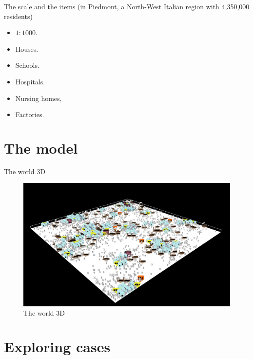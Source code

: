 \documentclass[8pt]{beamer}
\begin{document}
\begin{frame}{The scale and the items (in Piedmont, a North-West Italian region with 4,350,000 residents)}

\begin{itemize}

\item $1:1000$.

\bigskip

\item Houses.
\item Schools.
\item Hospitals.
\item Nursing homes,
\item Factories.

\end{itemize}

\end{frame}
\section{The model}


\begin{frame}{The world 3D}

\begin{figure}[H]
\center
\includegraphics[scale=0.55]{world3D.png}

\caption{The world 3D} 
\label{world3D}
\end{figure}

\end{frame}

\section{Exploring cases}
\end{document}
